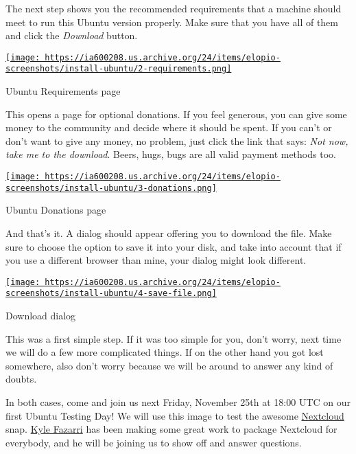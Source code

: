 \documentclass[12pt]{article}
\begin{document}
The next step shows you the recommended requirements that a machine should
meet to run this Ubuntu version properly. Make sure that you have all of them
and click the \emph{Download} button.

\begin{center}
  \href{
    https://ia600208.us.archive.org/24/items/elopio-screenshots/install-ubuntu/2-requirements.png}{
    \texttt{[image: 
    https://ia600208.us.archive.org/24/items/elopio-screenshots/install-ubuntu/2-requirements.png]}
  }
  \caption{Ubuntu Requirements page}
\end{center}

This opens a page for optional donations. If you feel generous, you can give
some money to the community and decide where it should be spent. If you can't
or don't want to give any money, no problem, just click the link that says:
\emph{Not now, take me to the download}. Beers, hugs, bugs are all valid
payment methods too.

\begin{center}
  \href{
    https://ia600208.us.archive.org/24/items/elopio-screenshots/install-ubuntu/3-donations.png}{
    \texttt{[image: 
    https://ia600208.us.archive.org/24/items/elopio-screenshots/install-ubuntu/3-donations.png]}
  }
  \caption{Ubuntu Donations page}
\end{center}

And that's it. A dialog should appear offering you to download the file. Make
sure to choose the option to save it into your disk, and take into account
that if you use a different browser than mine, your dialog might look
different.

\begin{center}
  \href{
    https://ia600208.us.archive.org/24/items/elopio-screenshots/install-ubuntu/4-save-file.png}{
    \texttt{[image: 
    https://ia600208.us.archive.org/24/items/elopio-screenshots/install-ubuntu/4-save-file.png]}
  }
  \caption{Download dialog}
\end{center}

This was a first simple step. If it was too simple for you, don't worry, next
time we will do a few more complicated things. If on the other hand you got
lost somewhere, also don't worry because we will be around to answer any kind
of doubts.

In both cases, come and join us next Friday, November 25th at 18:00 UTC on our
first Ubuntu Testing Day! We will use this image to test the awesome
\href{https://nextcloud.com/}{Nextcloud} snap.
\href{https://kyrofa.com/}{Kyle Fazarri} has been making some great work to
package Nextcloud for everybody, and he will be joining us to show off and
answer questions.
\end{document}
